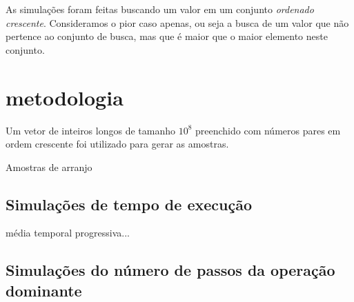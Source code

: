 As simulações foram feitas buscando um valor em um conjunto {\it ordenado crescente}. Consideramos o pior caso apenas, ou seja a busca de um valor que não pertence ao conjunto de busca, mas que é maior que o maior elemento neste conjunto.

\section{metodologia}

Um vetor de inteiros longos de tamanho $10^8$ preenchido com números pares em ordem crescente foi utilizado para gerar as amostras.

Amostras de arranjo

\subsection{Simulações de tempo de execução}

média temporal progressiva...

\subsection{Simulações do número de passos da operação dominante}
